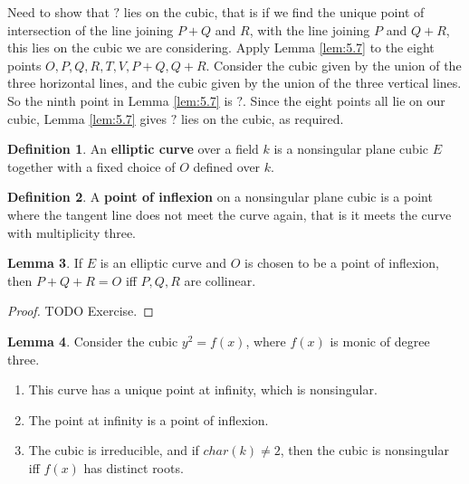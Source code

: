 \documentclass{article}
\newcommand{\rb}[1]{\left( #1 \right)}
\theoremstyle{definition}\newtheorem{definition}{Definition}[section]
\theoremstyle{definition}\newtheorem{remark}[definition]{Remark}
\theoremstyle{definition}\newtheorem*{example}{Example}
\theoremstyle{definition}\newtheorem*{note}{Note}
\newtheorem{lemma}[definition]{Lemma}
\begin{document}
Need to show that $ ? $ lies on the cubic, that is if we find the unique point of intersection of the line joining $ P + Q $ and $ R $, with the line joining $ P $ and $ Q + R $, this lies on the cubic we are considering. Apply Lemma \ref{lem:5.7} to the eight points $ O, P, Q, R, T, V, P + Q, Q + R $. Consider the cubic given by the union of the three horizontal lines, and the cubic given by the union of the three vertical lines. So the ninth point in Lemma \ref{lem:5.7} is $ ? $. Since the eight points all lie on our cubic, Lemma \ref{lem:5.7} gives $ ? $ lies on the cubic, as required.

\begin{definition}
An \textbf{elliptic curve} over a field $ k $ is a nonsingular plane cubic $ E $ together with a fixed choice of $ O $ defined over $ k $.
\end{definition}

\begin{definition}
A \textbf{point of inflexion} on a nonsingular plane cubic is a point where the tangent line does not meet the curve again, that is it meets the curve with multiplicity three.
\end{definition}

\begin{lemma}
\label{lem:5.10}
If $ E $ is an elliptic curve and $ O $ is chosen to be a point of inflexion, then $ P + Q + R = O $ iff $ P, Q, R $ are collinear.
\end{lemma}

\begin{proof}
TODO Exercise.
\end{proof}

\begin{lemma}
Consider the cubic $ y^2 = f\rb{x} $, where $ f\rb{x} $ is monic of degree three.
\begin{enumerate}
\item This curve has a unique point at infinity, which is nonsingular.
\item The point at infinity is a point of inflexion.
\item The cubic is irreducible, and if $ char\rb{k} \ne 2 $, then the cubic is nonsingular iff $ f\rb{x} $ has distinct roots.
\end{enumerate}
\end{lemma}
\end{document}
